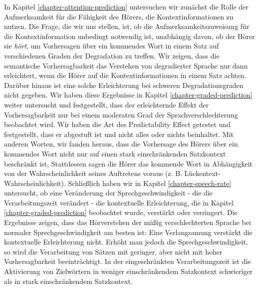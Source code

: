 \documentclass[a4paper, nobind]{templates/ociamthesis}
\begin{document}
\begin{romanpages}
\begin{abstractsecond}
In Kapitel \ref{chapter-attention-prediction} untersuchen wir zunächst die Rolle der Aufmerksamkeit für die Fähigkeit des Hörers, die Kontextinformationen zu nutzen.
Die Frage, die wir uns stellen, ist, ob die Aufmerksamkeitszuweisung für die Kontextinformation unbedingt notwendig ist, unabhängig davon, ob der Hörer sie \emph{hört}, um Vorhersagen über ein kommendes Wort in einem Satz auf verschiedenen Graden der Degradation zu treffen.
Wir zeigen, dass die semantische Vorhersagbarkeit das Verstehen von degradierter Sprache nur dann erleichtert, wenn die Hörer auf die Kontextinformationen in einem Satz achten.
Darüber hinaus ist eine solche Erleichterung bei schweren Degradationsgraden nicht gegeben.
Wir haben diese Ergebnisse in Kapitel \ref{chapter-graded-prediction} weiter untersucht und festgestellt, dass
der erleichternde Effekt der Vorhersagbarkeit nur bei einem moderaten Grad der Sprachverschlechterung beobachtet wird.
Wir haben die Art des Predictability Effect getestet und festgestellt, dass er abgestuft ist und nicht alles oder nichts beinhaltet.
Mit anderen Worten, wir fanden heraus, dass die Vorhersage des Hörers über ein kommendes Wort nicht nur auf einen stark einschränkenden Satzkontext beschränkt ist,
Stattdessen sagen die Hörer das kommende Wort in Abhängigkeit von der Wahrscheinlichkeit seines Auftretens voraus (z. B. Lückentext-Wahrscheinlichkeit).
Schließlich haben wir in Kapitel \ref{chapter-speech-rate} untersucht, ob eine Veränderung der Sprechgeschwindigkeit - die die Verarbeitungszeit verändert - die kontextuelle Erleichterung, die in Kapitel \ref{chapter-graded-prediction} beobachtet wurde, verstärkt oder verringert.
Die Ergebnisse zeigen, dass das Hörverstehen der mäßig verschlechterten Sprache bei normaler Sprechgeschwindigkeit am besten ist:
Eine Verlangsamung verstärkt die kontextuelle Erleichterung nicht.
Erhöht man jedoch die Sprechgeschwindigkeit, so wird die Verarbeitung von Sätzen mit geringer, aber nicht mit hoher Vorhersagbarkeit beeinträchtigt.
In der eingeschränkten Verarbeitungszeit ist die Aktivierung von Zielwörtern in weniger einschränkendem Satzkontext schwieriger als in stark einschränkendem Satzkontext.


\end{abstractsecond}
\end{romanpages}
\end{document}

